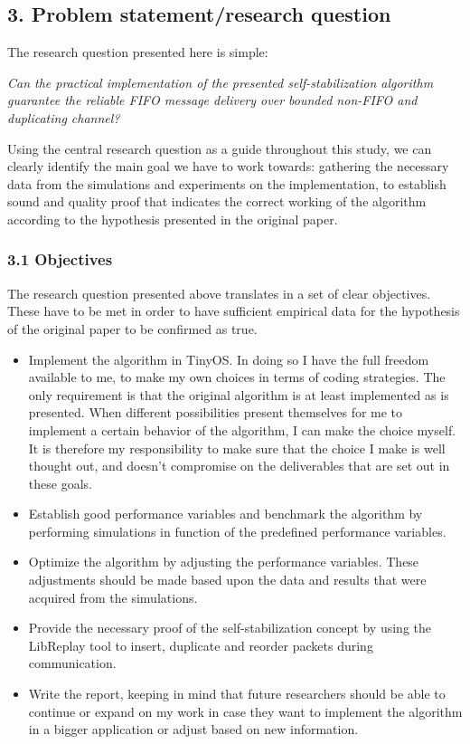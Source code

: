 \subsection{3. Problem statement/research
question}\label{problem-statementresearch-question}

The research question presented here is simple:

\emph{Can the practical implementation of the presented
self-stabilization algorithm guarantee the reliable FIFO message
delivery over bounded non-FIFO and duplicating channel?}

Using the central research question as a guide throughout this study, we
can clearly identify the main goal we have to work towards: gathering
the necessary data from the simulations and experiments on the
implementation, to establish sound and quality proof that indicates the
correct working of the algorithm according to the hypothesis presented
in the original paper.

\subsubsection{3.1 Objectives}\label{objectives}

The research question presented above translates in a set of clear
objectives. These have to be met in order to have sufficient empirical
data for the hypothesis of the original paper to be confirmed as true.

\begin{itemize}
\itemsep1pt\parskip0pt
\item
  Implement the algorithm in TinyOS. In doing so I have the full freedom
  available to me, to make my own choices in terms of coding strategies.
  The only requirement is that the original algorithm is at least
  implemented as is presented. When different possibilities present
  themselves for me to implement a certain behavior of the algorithm, I
  can make the choice myself. It is therefore my responsibility to make
  sure that the choice I make is well thought out, and doesn't
  compromise on the deliverables that are set out in these goals.\\
\item
  Establish good performance variables and benchmark the algorithm by
  performing simulations in function of the predefined performance
  variables.\\
\item
  Optimize the algorithm by adjusting the performance variables. These
  adjustments should be made based upon the data and results that were
  acquired from the simulations.\\
\item
  Provide the necessary proof of the self-stabilization concept by using
  the LibReplay tool to insert, duplicate and reorder packets during
  communication.\\
\item
  Write the report, keeping in mind that future researchers should be
  able to continue or expand on my work in case they want to implement
  the algorithm in a bigger application or adjust based on new
  information.
\end{itemize}

